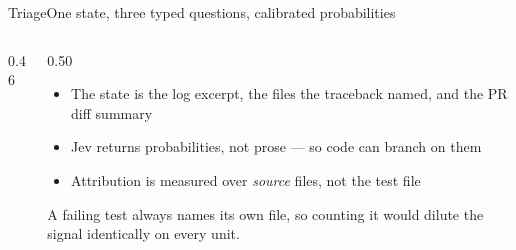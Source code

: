 \documentclass[aspectratio=169,10pt]{beamer}
\begin{document}
\begin{frame}{Triage}{One state, three typed questions, calibrated probabilities}
\vspace{0.3cm}
\begin{columns}[T]
\begin{column}{0.46\textwidth}
\end{column}
\begin{column}{0.50\textwidth}
\begin{itemize}\setlength\itemsep{0.5em}
  \item The state is the log excerpt, the files the traceback named, and the PR diff summary
  \item Jev returns \textcolor{ink}{probabilities, not prose} --- so code can branch on them
  \item Attribution is measured over \emph{source} files, not the test file
\end{itemize}
\vspace{0.2em}
{\footnotesize\textcolor{muted}{A failing test always names its own file, so counting
it would dilute the signal identically on every unit.}}
\end{column}
\end{columns}
\end{frame}
\end{document}
